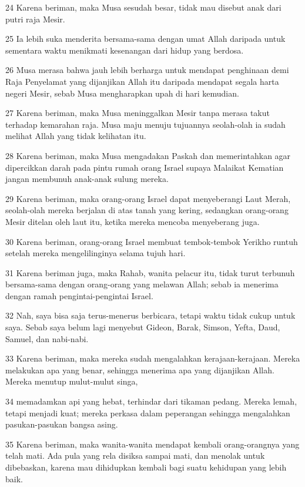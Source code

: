 \par 24 Karena beriman, maka Musa sesudah besar, tidak mau disebut anak dari putri raja Mesir.
\par 25 Ia lebih suka menderita bersama-sama dengan umat Allah daripada untuk sementara waktu menikmati kesenangan dari hidup yang berdosa.
\par 26 Musa merasa bahwa jauh lebih berharga untuk mendapat penghinaan demi Raja Penyelamat yang dijanjikan Allah itu daripada mendapat segala harta negeri Mesir, sebab Musa mengharapkan upah di hari kemudian.
\par 27 Karena beriman, maka Musa meninggalkan Mesir tanpa merasa takut terhadap kemarahan raja. Musa maju menuju tujuannya seolah-olah ia sudah melihat Allah yang tidak kelihatan itu.
\par 28 Karena beriman, maka Musa mengadakan Paskah dan memerintahkan agar dipercikkan darah pada pintu rumah orang Israel supaya Malaikat Kematian jangan membunuh anak-anak sulung mereka.
\par 29 Karena beriman, maka orang-orang Israel dapat menyeberangi Laut Merah, seolah-olah mereka berjalan di atas tanah yang kering, sedangkan orang-orang Mesir ditelan oleh laut itu, ketika mereka mencoba menyeberang juga.
\par 30 Karena beriman, orang-orang Israel membuat tembok-tembok Yerikho runtuh setelah mereka mengelilinginya selama tujuh hari.
\par 31 Karena beriman juga, maka Rahab, wanita pelacur itu, tidak turut terbunuh bersama-sama dengan orang-orang yang melawan Allah; sebab ia menerima dengan ramah pengintai-pengintai Israel.
\par 32 Nah, saya bisa saja terus-menerus berbicara, tetapi waktu tidak cukup untuk saya. Sebab saya belum lagi menyebut Gideon, Barak, Simson, Yefta, Daud, Samuel, dan nabi-nabi.
\par 33 Karena beriman, maka mereka sudah mengalahkan kerajaan-kerajaan. Mereka melakukan apa yang benar, sehingga menerima apa yang dijanjikan Allah. Mereka menutup mulut-mulut singa,
\par 34 memadamkan api yang hebat, terhindar dari tikaman pedang. Mereka lemah, tetapi menjadi kuat; mereka perkasa dalam peperangan sehingga mengalahkan pasukan-pasukan bangsa asing.
\par 35 Karena beriman, maka wanita-wanita mendapat kembali orang-orangnya yang telah mati. Ada pula yang rela disiksa sampai mati, dan menolak untuk dibebaskan, karena mau dihidupkan kembali bagi suatu kehidupan yang lebih baik.
